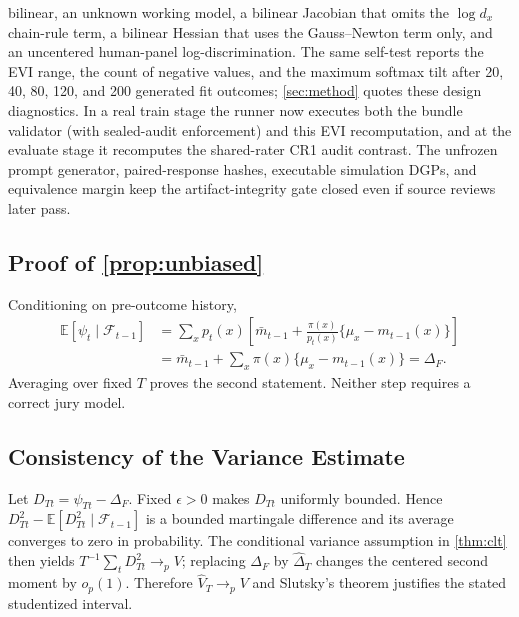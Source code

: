 \documentclass{article}
\begin{document}
bilinear, an unknown working model, a bilinear Jacobian that omits the
$\log d_x$ chain-rule term, a bilinear Hessian that uses the Gauss--Newton
term only, and an uncentered human-panel log-discrimination. The same self-test reports the EVI range, the count of negative
values, and the maximum softmax tilt after 20, 40, 80, 120, and 200 generated
fit outcomes; \cref{sec:method} quotes these design diagnostics. In a real
train stage the runner now executes both the bundle
validator (with sealed-audit enforcement) and this EVI recomputation, and at
the evaluate stage it recomputes the shared-rater CR1 audit contrast. The
unfrozen prompt generator,
paired-response hashes, executable simulation DGPs, and equivalence margin keep the
artifact-integrity gate closed even if source reviews later pass.

\subsection{Proof of \cref{prop:unbiased}}
Conditioning on pre-outcome history,
\begin{align}
\mathbb E[\psi_t\mid\mathcal F_{t-1}]
&=\sum_xp_t(x)\left[
\bar m_{t-1}+\frac{\pi(x)}{p_t(x)}
\{\mu_x-m_{t-1}(x)\}\right]\\
&=\bar m_{t-1}+\sum_x\pi(x)\{\mu_x-m_{t-1}(x)\}
=\Delta_F.
\end{align}
Averaging over fixed $T$ proves the second statement. Neither step requires a
correct jury model.

\subsection{Consistency of the Variance Estimate}
Let $D_{Tt}=\psi_{Tt}-\Delta_F$. Fixed $\epsilon>0$ makes $D_{Tt}$ uniformly
bounded. Hence
$D_{Tt}^2-\mathbb E[D_{Tt}^2\mid\mathcal F_{t-1}]$ is a bounded martingale
difference and its average converges to zero in probability. The conditional
variance assumption in \cref{thm:clt} then yields
$T^{-1}\sum_tD_{Tt}^2\to_p V$; replacing $\Delta_F$ by
$\widehat\Delta_T$ changes the centered second moment by $o_p(1)$. Therefore
$\widehat V_T\to_pV$ and Slutsky's theorem justifies the stated studentized
interval.
\end{document}
